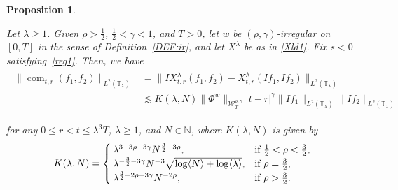 \documentclass[letterpaper, 11pt,  reqno]{amsart}
\newtheorem{proposition}[theorem]{Proposition}
\DeclareMathOperator{\com}{com}
\newcommand{\1}{\hspace{0.5mm}\text{I}\hspace{0.5mm}}
\newcommand{\noi}{\noindent}
\newcommand{\T}{\mathbb{T}}
\newcommand{\g}{\gamma}
\newcommand{\ld}{\lambda}
\newcommand{\les}{\lesssim}
\newcommand{\jb}[1]
{\langle #1 \rangle}
\newcommand{\N}{\mathbb{N}}
\newcommand{\W}{\mathcal{W}}
\numberwithin{equation}{section}
\numberwithin{theorem}{section}
\begin{document}
\begin{proposition}
\label{PROP:com}

Let $\ld \ge 1$.
Given $\rho  >  \frac 12$,  $\frac 12 < \g < 1$,  and $T> 0$, 
let  $w$ be $(\rho,\g)$-irregular
on $[0, T]$ 
 in the sense of Definition~\ref{DEF:ir}, 
 and let $X^\ld$ be as in \eqref{Xld1}.
Fix  $s < 0$ satisfying~\eqref{reg1}.
Then, we have 
\begin{align}
\begin{aligned}
 \|\com_{t, r}(f_1, f_2) \|_{L^2(\T_\ld)}&  = \|IX^{\ld}_{t,r}( f _1, f _2) - X^{\ld}_{t,r} (I f _1,I f _2) \|_{L^2(\T_\ld)}\\
& \les
   K(\ld, N )\| \Phi^{w} \|_{\W_{T}^{\rho, \g}}
      |t-r|^{\g}
\| I  f _1 \|_{L^2(\T_\ld)}   \| I  f _2 \|_{L^2(\T_\ld)}  
\end{aligned}
\label{I5}
\end{align}





\noi
for any $0\leq r<t\leq \ld^3T$, $\ld \ge 1$, and $N \in \N$, 
where $ K(\ld, N )$ is given by 
\begin{align}
K(\ld, N )
= \begin{cases}
\ld^{3- 3\rho-3\g} N^{\frac 32 - 3\rho}, & \text{if $\frac 12 < \rho < \frac 32$}, \\
\ld^{- \frac 32 - 3\g} N^{-3} \sqrt{\log \jb{N} + \log \jb{\ld}}, & \text{if $\rho =  \frac 32$}, \\
\ld^{ \frac 32 - 2\rho - 3\g} N^{-2\rho}, & \text{if $ \rho >  \frac 32$}.
\end{cases}
\label{I5a}
\end{align}





\end{proposition}
\end{document}
